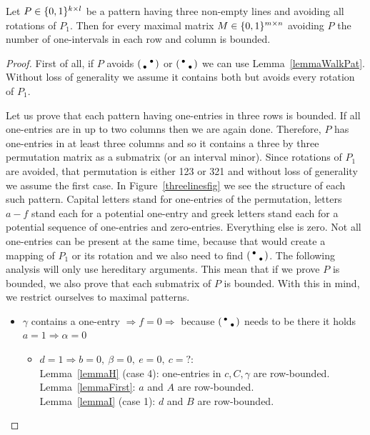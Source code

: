 \begin{lemma}
Let $P\in\{0,1\}^{k\times l}$ be a pattern having three non-empty lines and avoiding all rotations of $P_1$. Then for every maximal matrix $M\in\{0,1\}^{m\times n}$ avoiding $P$ the number of one-intervals in each row and column is bounded. 
\end{lemma}
\begin{proof}
First of all, if $P$ avoids $\left(\begin{smallmatrix} &\bullet\\\bullet& \end{smallmatrix}\right)$ or $\left(\begin{smallmatrix}\bullet& \\ &\bullet\end{smallmatrix}\right)$ we can use Lemma~\ref{lemmaWalkPat}. Without loss of generality we assume it contains both but avoids every rotation of $P_1$.

Let us prove that each pattern having one-entries in three rows is bounded. If all one-entries are in up to two columns then we are again done. Therefore, $P$ has one-entries in at least three columns and so it contains a three by three permutation matrix as a submatrix (or an interval minor). Since rotations of $P_1$ are avoided, that permutation is either 123 or 321 and without loss of generality we assume the first case. In Figure~\ref{threelinesfig} we see the structure of each such pattern. Capital letters stand for one-entries of the permutation, letters $a-f$ stand each for a potential one-entry and greek letters stand each for a potential sequence of one-entries and zero-entries. Everything else is zero. Not all one-entries can be present at the same time, because that would create a mapping of $P_1$ or its rotation and we also need to find $\left(\begin{smallmatrix}\bullet& \\ &\bullet\end{smallmatrix}\right)$. The following analysis will only use hereditary arguments. This mean that if we prove $P$ is bounded, we also prove that each submatrix of $P$ is bounded. With this in mind, we restrict ourselves to maximal patterns.
\begin{itemize}
	\item $\gamma$ contains a one-entry $\Rightarrow f=0\Rightarrow$ because $\left(\begin{smallmatrix}\bullet& \\ &\bullet\end{smallmatrix}\right)$ needs to be there it holds $a=1\Rightarrow\alpha=0$
		\begin{itemize}
			\item $d=1\Rightarrow b=0,\ \beta=0,\ e=0,\ c=?$:\\
				Lemma~\ref{lemmaH} (case 4): one-entries in $c,C,\gamma$ are row-bounded.\\
				Lemma~\ref{lemmaFirst}: $a$ and $A$ are row-bounded.\\
				Lemma~\ref{lemmaI} (case 1): $d$ and $B$ are row-bounded.\\
				

\end{itemize}
\end{itemize}
\end{proof}
